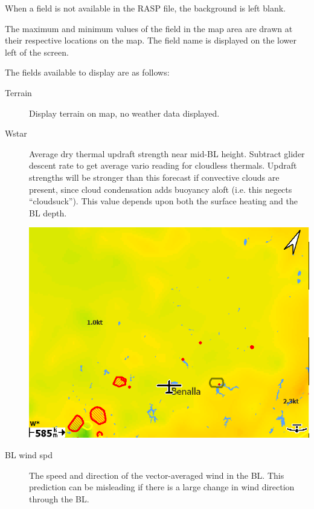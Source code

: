 \documentclass[a4paper,12pt]{refrep}
\begin{document}
When a field is not available in the RASP file, the background is left blank.

The maximum and minimum values of the field in the map area are drawn
at their respective locations on the map.  The field name is displayed
on the lower left of the screen.

The fields available to display are as follows:
\begin{description}
\item[Terrain] Display terrain on map, no weather data displayed.

\item[Wstar] 
Average dry thermal updraft strength near mid-BL height.  Subtract
glider descent rate to get average vario reading for cloudless
thermals.  Updraft strengths will be stronger than this forecast if
convective clouds are present, since cloud condensation adds buoyancy
aloft (i.e. this negects ``cloudsuck'').  This value depends upon both
the surface heating and the BL depth.

\begin{center}
\includegraphics[angle=0,width=\linewidth,keepaspectratio='true']{figures/rasp-wstar.png}
\end{center}

\item[BL wind spd] 
The speed and direction of the vector-averaged wind in the BL.  This
prediction can be misleading if there is a large change in wind
direction through the BL.


\end{description}
\end{document}
